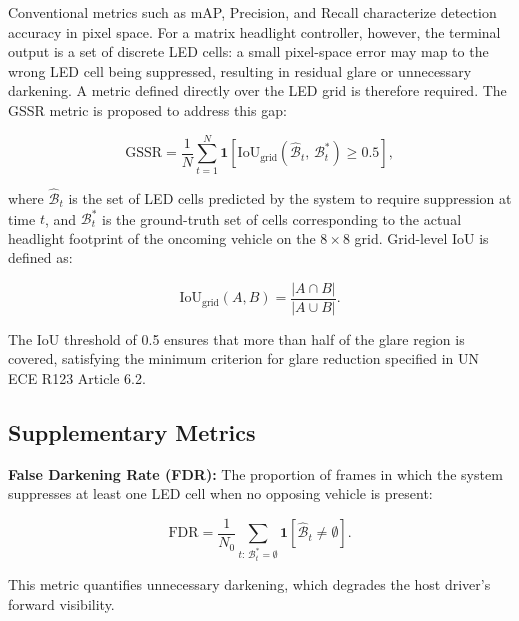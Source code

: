 \documentclass[pdflatex,sn-mathphys-num]{sn-jnl}%
\theoremstyle{thmstyleone}%
\theoremstyle{thmstyletwo}%
\theoremstyle{thmstylethree}%
\begin{document}
\label{subsec:gssr}

Conventional metrics such as mAP, Precision, and Recall characterize
detection accuracy in pixel space. For a matrix headlight controller,
however, the terminal output is a set of discrete LED cells: a small
pixel-space error may map to the wrong LED cell being suppressed,
resulting in residual glare or unnecessary darkening. A metric defined
directly over the LED grid is therefore required. The GSSR metric is
proposed to address this gap:

\begin{equation}
\mathrm{GSSR} = \frac{1}{N} \sum_{t=1}^{N}
\mathbf{1}\!\left[
  \mathrm{IoU}_{\mathrm{grid}}\!\left(\hat{\mathcal{B}}_t,\,
  \mathcal{B}^{*}_t\right) \geq 0.5
\right],
\label{eq:gssr}
\end{equation}

\noindent where $\hat{\mathcal{B}}_t$ is the set of LED cells predicted
by the system to require suppression at time $t$, and
$\mathcal{B}^{*}_t$ is the ground-truth set of cells corresponding to
the actual headlight footprint of the oncoming vehicle on the
$8 \times 8$ grid. Grid-level IoU is defined as:

\begin{equation}
\mathrm{IoU}_{\mathrm{grid}}(A,B) =
\frac{|A \cap B|}{|A \cup B|}.
\label{eq:grid_iou}
\end{equation}

The IoU threshold of 0.5 ensures that more than half of the glare
region is covered, satisfying the minimum criterion for glare reduction
specified in UN ECE R123 Article 6.2.

\subsection{Supplementary Metrics}
\label{subsec:metrics}

\noindent\textbf{False Darkening Rate (FDR):}
The proportion of frames in which the system suppresses at least one
LED cell when no opposing vehicle is present:

\begin{equation}
\mathrm{FDR} = \frac{1}{N_0}
\sum_{t:\, \mathcal{B}^{*}_t = \emptyset}
\mathbf{1}\!\left[\hat{\mathcal{B}}_t \neq \emptyset\right].
\label{eq:fdr}
\end{equation}

This metric quantifies unnecessary darkening, which degrades the host
driver's forward visibility. ~\cite{Lau2025FAR}
\end{document}
